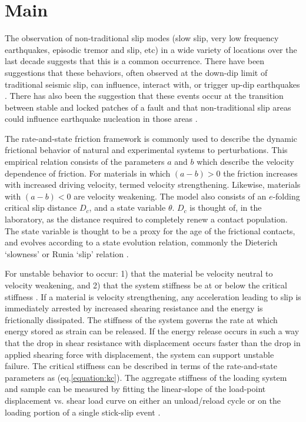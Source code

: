 \documentclass[11pt]{article}
\begin{document}
\section{Main}

The observation of non-traditional slip modes (slow slip, very low frequency
earthquakes, episodic tremor and slip, etc) in a wide variety of locations
over the last decade suggests that this is a common occurrence. There have been
suggestions that these behaviors, often observed at the down-dip limit of
traditional seismic slip, can influence, interact with, or trigger up-dip
earthquakes \cite{Dragert:2001ed,Ide:2007fi}. There has also been the suggestion
that these events occur at the transition between stable and locked patches
of a fault and that non-traditional slip areas could influence earthquake
nucleation in those areas \cite{Linde:1996hn}.

The rate-and-state friction framework is commonly used to describe the dynamic
frictional behavior of natural and experimental systems to perturbations. This
empirical relation consists of the parameters $a$ and $b$ which describe the
velocity dependence of friction. For materials in which $(a-b)>0$ the friction
increases with increased driving velocity, termed velocity strengthening. Likewise,
materials with $(a-b)<0$ are velocity weakening. The model also consists of an
$e$-folding critical slip distance $D_c$, and a state variable $\theta$.
$D_c$ is thought of, in the laboratory, as the distance required to completely
renew a contact population.
The
state variable is thought to be a proxy for the age of the frictional contacts, and
evolves according to a state evolution relation, commonly the Dieterich `slowness'
or Runia `slip' relation \cite{Marone:1998,Dieterich:1979,Ruina:1983}.

For unstable behavior to occur: 1) that the material be
velocity neutral to velocity weakening, and 2) that the system stiffness be at
or below the critical stiffness \cite{Marone:1998, Scholz:2002}. If a
material is velocity strengthening, any acceleration leading to slip is
immediately arrested by increased shearing resistance and the energy is
frictionally dissipated. The stiffness of the system governs the rate at which
energy stored as strain can be released. If the energy release occurs in such a
way that the drop in shear resistance with displacement occurs faster than the
drop in applied shearing force with displacement, the system can support
unstable failure. The critical stiffness can be described in terms of the
rate-and-state parameters as (eq.\ref{equation:kc}). The aggregate stiffness of
the loading system and sample can be measured by fitting the linear-slope
of the load-point displacement vs. shear load curve on either an unload/reload
cycle or on the loading portion of a single stick-slip event \cite{Leeman:2015}.
\end{document}
